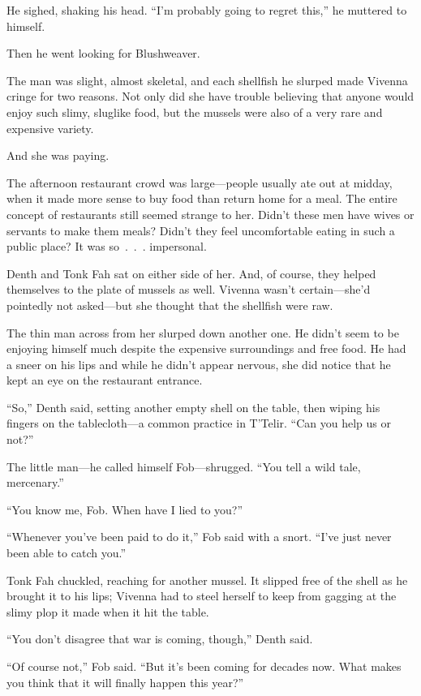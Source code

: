 He sighed, shaking his head. “I’m probably going to regret this,” he muttered to himself.

Then he went looking for Blushweaver.

\orn

The man was slight, almost skeletal, and each shellfish he slurped made Vivenna cringe for two reasons. Not only did she have trouble believing that anyone would enjoy such slimy, sluglike food, but the mussels were also of a very rare and expensive variety.

And she was paying.

The afternoon restaurant crowd was large—people usually ate out at midday, when it made more sense to buy food than return home for a meal. The entire concept of restaurants still seemed strange to her. Didn’t these men have wives or servants to make them meals? Didn’t they feel uncomfortable eating in such a public place? It was so~.~.~. impersonal.

Denth and Tonk Fah sat on either side of her. And, of course, they helped themselves to the plate of mussels as well. Vivenna wasn’t certain—she’d pointedly not asked—but she thought that the shellfish were raw.

The thin man across from her slurped down another one. He didn’t seem to be enjoying himself much despite the expensive surroundings and free food. He had a sneer on his lips and while he didn’t appear nervous, she did notice that he kept an eye on the restaurant entrance.

“So,” Denth said, setting another empty shell on the table, then wiping his fingers on the tablecloth—a common practice in T’Telir. “Can you help us or not?”

The little man—he called himself Fob—shrugged. “You tell a wild tale, mercenary.”

“You know me, Fob. When have I lied to you?”

“Whenever you’ve been paid to do it,” Fob said with a snort. “I’ve just never been able to catch you.”

Tonk Fah chuckled, reaching for another mussel. It slipped free of the shell as he brought it to his lips; Vivenna had to steel herself to keep from gagging at the slimy plop it made when it hit the table.

“You don’t disagree that war is coming, though,” Denth said.

“Of course not,” Fob said. “But it’s been coming for decades now. What makes you think that it will finally happen this year?”

